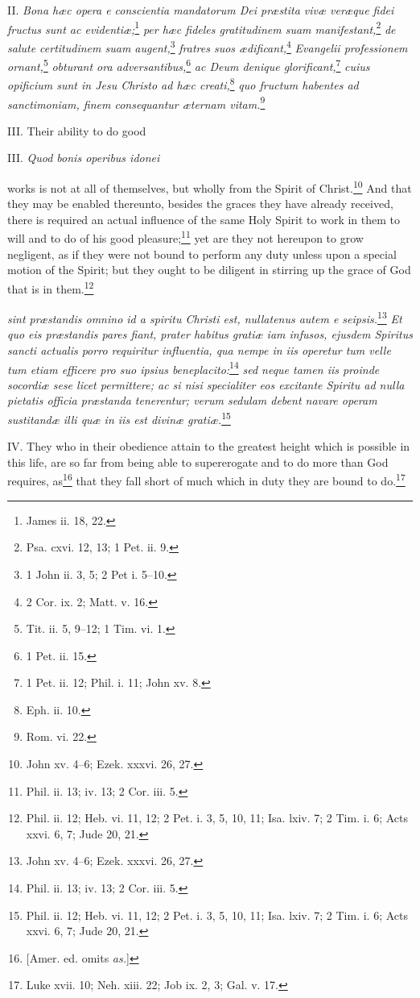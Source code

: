 II. \emph{Bona hæc opera e conscientia mandatorum Dei præstita vivæ veræque fidei fructus sunt ac evidentiæ;}\footnote{James ii. 18, 22.}\emph{ per hæc fideles gratitudinem suam manifestant,}\footnote{Psa. cxvi. 12, 13; 1 Pet. ii. 9.}\emph{ de salute certitudinem suam augent,}\footnote{1 John ii. 3, 5; 2 Pet i. 5–10.}\emph{ fratres suos ædificant,}\footnote{2 Cor. ix. 2; Matt. v. 16.}\emph{ Evangelii professionem ornant,}\footnote{Tit. ii. 5, 9–12; 1 Tim. vi. 1.}\emph{ obturant ora adversantibus,}\footnote{1 Pet. ii. 15.}\emph{ ac Deum denique glorificant,}\footnote{1 Pet. ii. 12; Phil. i. 11; John xv. 8.}\emph{ cuius opificium sunt in Jesu Christo ad hæc creati,}\footnote{Eph. ii. 10.}\emph{ quo fructum habentes ad sanctimoniam, finem consequantur æternam vitam.}\footnote{Rom. vi. 22.}

III. Their ability to do good

III. \emph{Quod bonis operibus idonei }

works is not at all of themselves, but wholly from the Spirit of Christ.\footnote{John xv. 4–6; Ezek. xxxvi. 26, 27.} And that they may be enabled thereunto, besides the graces they have already received, there is required an actual influence of the same Holy Spirit to work in them to will and to do of his good pleasure;\footnote{Phil. ii. 13; iv. 13; 2 Cor. iii. 5.} yet are they not hereupon to grow negligent, as if they were not bound to perform any duty unless upon a special motion of the Spirit; but they ought to be diligent in stirring up the grace of God that is in them.\footnote{Phil. ii. 12; Heb. vi. 11, 12; 2 Pet. i. 3, 5, 10, 11; Isa. lxiv. 7; 2 Tim. i. 6; Acts xxvi. 6, 7; Jude 20, 21.}

\emph{sint præstandis omnino id a spiritu Christi est, nullatenus autem e seipsis.}\footnote{John xv. 4–6; Ezek. xxxvi. 26, 27.}\emph{ Et quo eis præstandis pares fiant, prater habitus gratiæ iam infusos, ejusdem Spiritus sancti actualis porro requiritur influentia, qua nempe in iis operetur tum velle tum etiam efficere pro suo ipsius beneplacito:}\footnote{Phil. ii. 13; iv. 13; 2 Cor. iii. 5.}\emph{ sed neque tamen iis proinde socordiæ sese licet permittere; ac si nisi specialiter eos excitante Spiritu ad nulla pietatis officia præstanda tenerentur; verum sedulam debent navare operam sustitandæ illi quæ in iis est divinæ gratiæ.}\footnote{Phil. ii. 12; Heb. vi. 11, 12; 2 Pet. i. 3, 5, 10, 11; Isa. lxiv. 7; 2 Tim. i. 6; Acts xxvi. 6, 7; Jude 20, 21.}

IV. They who in their obedience attain to the greatest height which is possible in this life, are so far from being able to supererogate and to do more than God requires, as\footnote{[Amer. ed. omits \emph{as.}]} that they fall short of much which in duty they are bound to do.\footnote{Luke xvii. 10; Neh. xiii. 22; Job ix. 2, 3; Gal. v. 17.}

